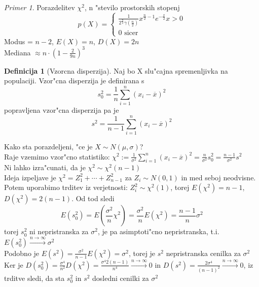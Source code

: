 \documentclass[a4paper,12pt]{article}
\theoremstyle{definition}
\newtheorem{defn}[counter]{Definicija}
\theoremstyle{remark}
\newtheorem*{ex}{Primer}
\begin{document}
\begin{ex}
    Porazdelitev $\chi^2$, n "stevilo prostorskih stopenj \\
    \begin{equation*}
        p(X) = \begin{cases}
            \frac{1}{2^{\frac{n}{2}} \gamma(\frac{n}{2})} x^{\frac{n}{2}-1} e^{-\frac{x}{2}} x > 0 \\
            0 \text{ sicer}
        \end{cases}
    \end{equation*}
    Modus = $n-2$, $E(X) = n$, $D(X) = 2n$ \\
    Mediana $\approx n \cdot (1 - \frac{2}{9n})^3$
\end{ex}

\begin{defn}[Vzorcna disperzija]
    Naj bo X slu"cajna spremenljivka na populaciji. Vzor"cna disperzija je definirana s
    \begin{equation*}
        s_0^2 = \frac{1}{n} \sum_{i=1}^n (x_i - \overline{x})^2
    \end{equation*}
    popravljena vzor"cna disperzija pa je
    \begin{equation*}
        s^2 = \frac{1}{n-1} \sum_{i=1}^{n} (x_i - \overline{x})^2
    \end{equation*}
\end{defn}

Kako sta porazdeljeni, "ce je $X \sim N(\mu, \sigma)$? \\
Raje vzemimo vzor"cno statistiko: $\chi^2 := \frac{1}{\sigma^2} \sum_{i=1}^n (x_i - \overline{x})^2 =
\frac{n}{\sigma^2} s_0^2 = \frac{n-1}{\sigma^2} s^2$ \\
Ni lahko izra"cunati, da je $\chi^2 \sim \chi^2(n-1)$ \\
Ideja izpeljave je $\chi^2 = Z_1^2 + \cdots + Z_{n-1}^2$ za $Z_i \sim N(0,1)$ in med seboj neodvisne.
Potem uporabimo trditev iz verjetnosti: $Z_i^2 \sim \chi^2(1)$, torej $E(\chi^2) = n-1$, $D(\chi^2) = 2(n-1)$.
Od tod sledi
\begin{equation*}
    E(s_0^2) = E(\frac{\sigma^2}{n} \chi^2) = \frac{\sigma^2}{n} E(\chi^2) = \frac{n-1}{n} \sigma^2
\end{equation*}
torej $s_0^2$ ni nepristranska za $\sigma^2$, je pa asimptoti"cno nepristranska, t.i.
$E(s_0^2) \stackrel{n \to \infty}{\to} \sigma^2$ \\
Podobno je $E(s^2) = \frac{\sigma^2}{n-1} E(\chi^2) = \sigma^2$, torej je $s^2$ nepristranska cenilka za
$\sigma^2$ \\
Ker je $D(s_0^2) = \frac{\sigma^4}{n^2} D(\chi^2) = \frac{\sigma^4 2(n-1)}{n^4} \stackrel{n \to \infty}{\to} 0$
in $D(s^2) = \frac{2 \sigma^4}{(n-1)^2} \stackrel{n \to \infty}{\to} 0$, iz trditve sledi, da sta $s_0^2$ in
$s^2$ dosledni cenilki za $\sigma^2$
\end{document}
